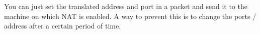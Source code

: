 You can just set the translated address and port in a packet and send it to the machine on which NAT is enabled. A way to prevent this is to change the ports / address after a certain period of time.
